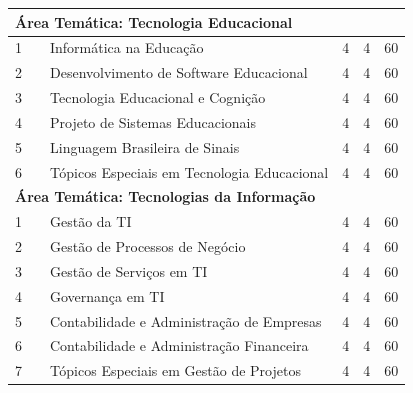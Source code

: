\documentclass[
	12pt,				%
	openright,			%
  oneside,     %
	a4paper,			%
	chapter=TITLE,		%
	english,			%
	french,				%
	spanish,			%
	brazil				%
	]{abntex2}
\begin{document}
\begin{apendicesenv}
\begin{longtable}{r|r|l|r|r|r}
\multicolumn{6}{l}{\textbf{Área Temática: Tecnologia Educacional}} \\ \hline
    1     &       & Informática na Educação & 4     & 4     & 60 \\ \hline
    2     &       & Desenvolvimento de Software Educacional & 4     & 4     & 60 \\ \hline
    3     &       & Tecnologia Educacional e Cognição & 4     & 4     & 60 \\ \hline
    4     &       & Projeto de Sistemas Educacionais & 4     & 4     & 60 \\ \hline
    5     &       & Linguagem Brasileira de Sinais & 4     & 4     & 60 \\ \hline
    6     &       & \small{Tópicos Especiais em Tecnologia Educacional} & 4     & 4     & 60 \\ \hline

\multicolumn{6}{l}{\textbf{Área Temática: Tecnologias da Informação}} \\ \hline
    1     &       & Gestão da TI & 4     & 4     & 60 \\ \hline
    2     &       & Gestão de Processos de Negócio & 4     & 4     & 60 \\ \hline
    3     &       & Gestão de Serviços em TI & 4     & 4     & 60 \\ \hline
    4     &       & Governança em TI & 4     & 4     & 60 \\ \hline
    5     &       & Contabilidade e Administração de Empresas & 4     & 4     & 60 \\ \hline
    6     &       & Contabilidade e Administração Financeira & 4     & 4     & 60 \\ \hline
    7     &       & \small{Tópicos Especiais em Gestão de Projetos} & 4     & 4     & 60 \\ \hline


    \end{longtable}%




\begin{landscape}


\end{landscape}
\end{apendicesenv}
\end{document}

